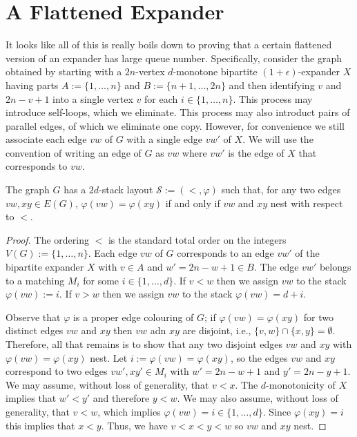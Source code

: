 \documentclass{patmorin}
\begin{document}
\section{A Flattened Expander}

It looks like all of this is really boils down to proving that a certain flattened version of an expander has large queue number.  Specifically, consider the graph obtained by starting with a $2n$-vertex $d$-monotone bipartite $(1+\epsilon)$-expander $X$ having parts $A:=\{1,\ldots,n\}$ and $B:=\{n+1,\ldots,2n\}$ and then identifying $v$ and $2n-v+1$ into a single vertex $v$ for each $i\in\{1,\ldots,n\}$.  This process may introduce self-loops, which we eliminate.  This process may also introduct pairs of parallel edges, of which we eliminate one copy.  However, for convenience we still associate each edge $vw$ of $G$ with a single edge $vw'$ of $X$.  We will use the convention of writing an edge of $G$ as $vw$ where $vw'$ is the edge of $X$ that corresponds to $vw$.

\begin{lem}\label{partition_into_rainbows}
  The graph $G$ has a $2d$-stack layout $\mathcal{S}:=(<,\varphi)$ such that, for any two edges $vw,xy\in E(G)$, $\varphi(vw)=\varphi(xy)$ if and only if $vw$ and $xy$ nest with respect to $<$.
\end{lem}

\begin{proof}
  The ordering $<$ is the standard total order on the integers $V(G):=\{1,\ldots,n\}$. Each edge $vw$ of $G$ corresponds to an edge $vw'$ of the bipartite expander $X$ with $v\in A$ and $w'=2n-w+1\in B$.  The edge $vw'$ belongs to a matching $M_i$ for some $i\in\{1,\ldots,d\}$.  If $v < w$ then we assign $vw$ to the stack $\varphi(vw):=i$.  If $v > w$ then we assign $vw$ to the stack $\varphi(vw)=d+i$.

  Observe that $\varphi$ is a proper edge colouring of $G$; if $\varphi(vw)=\varphi(xy)$ for two distinct edges $vw$ and $xy$ then $vw$ adn $xy$ are disjoint, i.e., $\{v,w\}\cap\{x,y\}=\emptyset$.  Therefore, all that remains is to show that any two disjoint edges $vw$ and $xy$ with $\varphi(vw)=\varphi(xy)$ nest.  Let  $i:=\varphi(vw)=\varphi(xy)$, so the edges $vw$ and $xy$ correspond to two edges $vw',xy'\in M_i$ with $w'=2n-w+1$ and $y'=2n-y+1$.  We may assume, without loss of generality, that $v<x$.  The $d$-monotonicity of $X$ implies that $w' < y'$ and therefore $y < w$.  We may also assume, without loss of generality, that $v < w$, which implies $\varphi(vw)=i\in\{1,\ldots,d\}$.  Since $\varphi(xy)=i$ this implies that $x < y$.  Thus, we have $v < x < y < w$ so $vw$ and $xy$ nest.
\end{proof}
\end{document}
